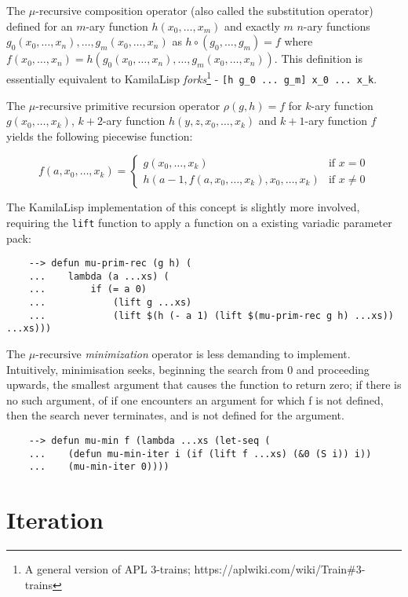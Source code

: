 The $\mu$-recursive composition operator (also called the substitution operator) defined for an $m$-ary function $h(x_0, \dots, x_m)$ and exactly $m$ $n$-ary functions $g_0(x_0, \dots, x_n), \dots, g_m(x_0, \dots, x_n)$ as $h\circ(g_0, \dots, g_m) = f$ where $f(x_0, \dots, x_n) = h(g_0(x_0, \dots, x_n), \dots, g_m(x_0, \dots, x_n))$. This definition is essentially equivalent to KamilaLisp \textit{forks}\footnote{A general version of APL 3-trains; https://aplwiki.com/wiki/Train\#3-trains} - \verb|[h g_0 ... g_m] x_0 ... x_k|.

The $\mu$-recursive primitive recursion operator $\rho(g,h)=f$ for $k$-ary function $g(x_0,\dots,x_k)$, $k+2$-ary function $h(y,z,x_0,\dots,x_k)$ and $k+1$-ary function $f$ yields the following piecewise function:

\begin{equation*}
f(a,x_0,\dots,x_k)=
    \begin{cases}
        g(x_0,\dots,x_k) & \text{if } x = 0\\
        h(a-1,f(a,x_0,\dots,x_k),x_0,\dots,x_k) & \text{if } x \ne 0
    \end{cases}
\end{equation*}

The KamilaLisp implementation of this concept is slightly more involved, requiring the \verb|lift| function to apply a function on a existing variadic parameter pack:

\begin{Verbatim}
    --> defun mu-prim-rec (g h) (
    ...    lambda (a ...xs) (
    ...        if (= a 0)
    ...            (lift g ...xs)
    ...            (lift $(h (- a 1) (lift $(mu-prim-rec g h) ...xs)) ...xs)))
\end{Verbatim}

The $\mu$-recursive \textit{minimization} operator is less demanding to implement. Intuitively, minimisation seeks, beginning the search from 0 and proceeding upwards, the smallest argument that causes the function to return zero; if there is no such argument, of if one encounters an argument for which f is not defined, then the search never terminates, and is not defined for the argument.

\begin{Verbatim}
    --> defun mu-min f (lambda ...xs (let-seq (
    ...    (defun mu-min-iter i (if (lift f ...xs) (&0 (S i)) i))
    ...    (mu-min-iter 0))))
\end{Verbatim}

\section{Iteration}

